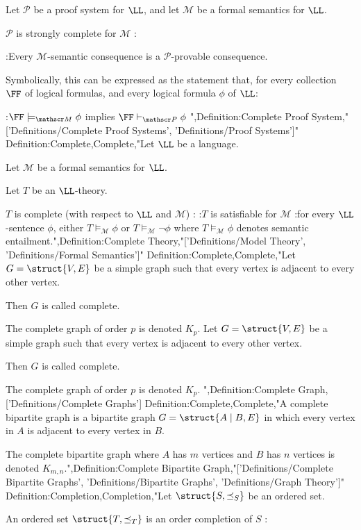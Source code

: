 Let $\mathscr P$ be a proof system for $\LL$, and let $\mathscr M$ be a formal semantics for $\LL$.


$\mathscr P$ is strongly complete for $\mathscr M$ :

:Every $\mathscr M$-semantic consequence is a $\mathscr P$-provable consequence.

Symbolically, this can be expressed as the statement that, for every collection $\FF$ of logical formulas, and every logical formula $\phi$ of $\LL$:

:$\FF \models_{\mathscr M} \phi$ implies $\FF \vdash_{\mathscr P} \phi$
",Definition:Complete Proof System,"['Definitions/Complete Proof Systems', 'Definitions/Proof Systems']"
Definition:Complete,Complete,"Let $\LL$ be a language.

Let $\mathscr M$ be a formal semantics for $\LL$.

Let $T$ be an $\LL$-theory.


$T$ is complete (with respect to $\LL$ and $\mathscr M$) :
:$T$ is satisfiable for $\mathscr M$
:for every $\LL$-sentence $\phi$, either $T \models_{\mathscr M} \phi$ or $T \models_{\mathscr M} \neg \phi$
where $T \models_{\mathscr M} \phi$ denotes semantic entailment.",Definition:Complete Theory,"['Definitions/Model Theory', 'Definitions/Formal Semantics']"
Definition:Complete,Complete,"Let $G = \struct {V, E}$ be a simple graph such that every vertex is adjacent to every other vertex.

Then $G$ is called complete.


The complete graph of order $p$ is denoted $K_p$.
Let $G = \struct {V, E}$ be a simple graph such that every vertex is adjacent to every other vertex.

Then $G$ is called complete.


The complete graph of order $p$ is denoted $K_p$.
",Definition:Complete Graph,['Definitions/Complete Graphs']
Definition:Complete,Complete,"A complete bipartite graph is a bipartite graph $G = \struct {A \mid B, E}$ in which every vertex in $A$ is adjacent to every vertex in $B$.

The complete bipartite graph where $A$ has $m$ vertices and $B$ has $n$ vertices is denoted $K_{m, n}$.",Definition:Complete Bipartite Graph,"['Definitions/Complete Bipartite Graphs', 'Definitions/Bipartite Graphs', 'Definitions/Graph Theory']"
Definition:Completion,Completion,"Let $\struct {S, \preceq_S}$ be an ordered set.


An ordered set $\struct {T, \preceq_T}$ is an order completion of $S$ :

